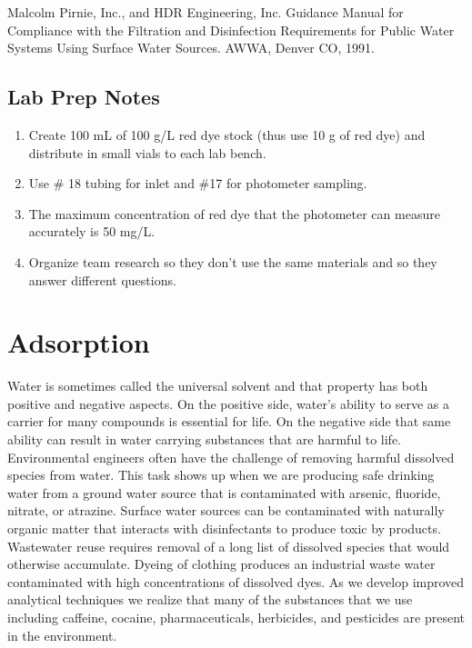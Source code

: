 \documentclass[letterpaper,10pt,english]{sphinxmanual}
\begin{document}
Malcolm Pirnie, Inc., and HDR Engineering, Inc. Guidance Manual for Compliance with the Filtration and Disinfection Requirements for Public Water Systems Using Surface Water Sources. AWWA, Denver CO, 1991.


\section{Lab Prep Notes}
\label{\detokenize{Reactor_Characteristics/Reactor_Characteristics:lab-prep-notes}}\label{\detokenize{Reactor_Characteristics/Reactor_Characteristics:heading-reactor-lab-prep-notes}}\begin{enumerate}
\item {} 
Create 100 mL of 100 g/L red dye stock (thus use 10 g of red dye) and distribute in small vials to each lab bench.

\item {} 
Use \# 18 tubing for inlet and \#17 for photometer sampling.

\item {} 
The maximum concentration of red dye that the photometer can measure accurately is 50 mg/L.

\item {} 
Organize team research so they don’t use the same materials and so they answer different questions.

\end{enumerate}


\chapter{Adsorption}
\label{\detokenize{Adsorption/Adsorption:adsorption}}\label{\detokenize{Adsorption/Adsorption:title-adsorption}}\label{\detokenize{Adsorption/Adsorption::doc}}
Water is sometimes called the universal solvent and that property has both positive and negative aspects. On the positive side, water’s ability to serve as a carrier for many compounds is essential for life. On the negative side that same ability can result in water carrying substances that are harmful to life. Environmental engineers often have the challenge of removing harmful dissolved species from water. This task shows up when we are producing safe drinking water from a ground water source that is contaminated with arsenic, fluoride, nitrate, or atrazine. Surface water sources can be contaminated with naturally organic matter that interacts with disinfectants to produce toxic by products. Wastewater reuse requires removal of a long list of dissolved species that would otherwise accumulate. Dyeing of clothing produces an industrial waste water contaminated with high concentrations of dissolved dyes. As we develop improved analytical techniques we realize that many of the substances that we use including caffeine, cocaine, pharmaceuticals, herbicides, and pesticides are present in the environment.
\end{document}
